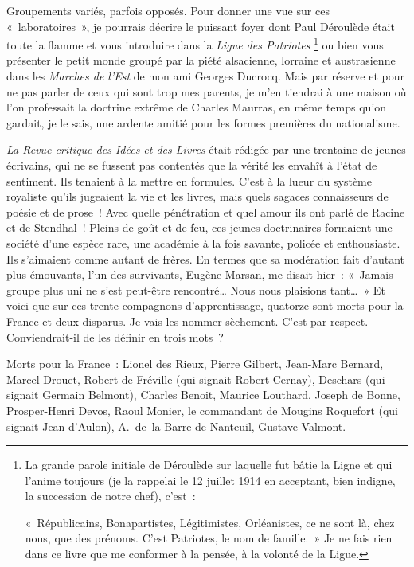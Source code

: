 \documentclass[french,twoside]{book} %
\begin{document}
Groupements variés, parfois opposés. Pour donner une vue sur ces « laboratoires », je pourrais décrire le puissant foyer dont Paul Déroulède était toute la flamme et vous introduire dans la {\itshape Ligue des Patriotes} \footnote{\noindent La grande parole initiale de Déroulède sur laquelle fut bâtie la Ligne et qui l’anime toujours (je la rappelai le 12 juillet 1914 en acceptant, bien indigne, la succession de notre chef), c’est :‌\par
 « Républicains, Bonapartistes, Légitimistes, Orléanistes, ce ne sont là, chez nous, que des prénoms. C’est Patriotes, le nom de famille. » Je ne fais rien dans ce livre que me conformer à la pensée, à la volonté de la Ligue.
 } ou bien vous présenter le petit monde groupé par la piété alsacienne, lorraine et austrasienne dans les {\itshape Marches de l’Est} de mon ami Georges Ducrocq. Mais par réserve et pour ne pas parler de ceux qui sont trop mes parents, je m’en tiendrai à une maison où l’on professait la doctrine extrême de Charles Maurras, en même temps qu’on gardait, je le sais, une ardente amitié pour les formes premières du nationalisme.‌\par
{\itshape La Revue critique des Idées et des Livres} était rédigée par une trentaine de jeunes écrivains, qui ne se fussent pas contentés que la vérité les envahît à l’état de sentiment. Ils tenaient à la mettre en formules. C’est à la lueur du système royaliste qu’ils jugeaient la vie et les livres, mais quels sagaces connaisseurs de poésie et de prose ! Avec quelle pénétration et quel amour ils ont parlé de Racine et de Stendhal ! Pleins de goût et de feu, ces jeunes doctrinaires formaient une société d’une espèce rare, une académie à la fois savante, policée et enthousiaste. Ils s’aimaient comme autant de frères. En termes que sa modération fait d’autant plus émouvants, l’un des survivants, Eugène Marsan, me disait hier : « Jamais groupe plus uni ne s’est peut-être rencontré… Nous nous plaisions tant… » Et voici que sur ces trente compagnons d’apprentissage, quatorze sont morts pour la France et deux disparus. Je vais les nommer sèchement. C’est par respect. Conviendrait-il de les définir en trois mots ?‌\par
Morts pour la France : Lionel des Rieux, Pierre Gilbert, Jean-Marc Bernard, Marcel Drouet, Robert de Fréville (qui signait Robert Cernay), Deschars (qui signait Germain Belmont), Charles Benoit, Maurice Louthard, Joseph de Bonne, Prosper-Henri Devos, Raoul Monier, le commandant de Mougins Roquefort (qui signait Jean d’Aulon), A. de la Barre de Nanteuil, Gustave Valmont.‌\par
\end{document}
